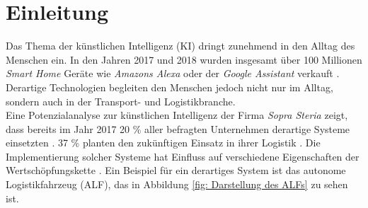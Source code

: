 
\chapter{Einleitung}
\label{ch: Einleitung}
	

		Das Thema der künstlichen Intelligenz (KI) dringt zunehmend in den Alltag des Menschen ein. In den Jahren 2017 und 2018 wurden insgesamt über 100 Millionen \textit{Smart Home} Geräte wie \textit{Amazons Alexa} oder der \textit{Google Assistant} verkauft \cite{smart}. Derartige Technologien begleiten den Menschen jedoch nicht nur im Alltag, sondern auch in der Transport- und Logistikbranche.\\
		
		Eine Potenzialanalyse zur künstlichen Intelligenz der Firma \textit{Sopra Steria} zeigt, dass bereits im Jahr 2017 20 \% aller befragten Unternehmen derartige Systeme einsetzten \cite{sopra}. 37 \% planten den zukünftigen Einsatz in ihrer Logistik \cite{sopra}. Die Implementierung solcher Systeme hat Einfluss auf verschiedene Eigenschaften der Wertschöpfungskette \cite{sopra}. Ein Beispiel für ein derartiges System ist das autonome Logistikfahrzeug (ALF), das in Abbildung \ref{fig: Darstellung des ALFs} zu sehen ist.
		
